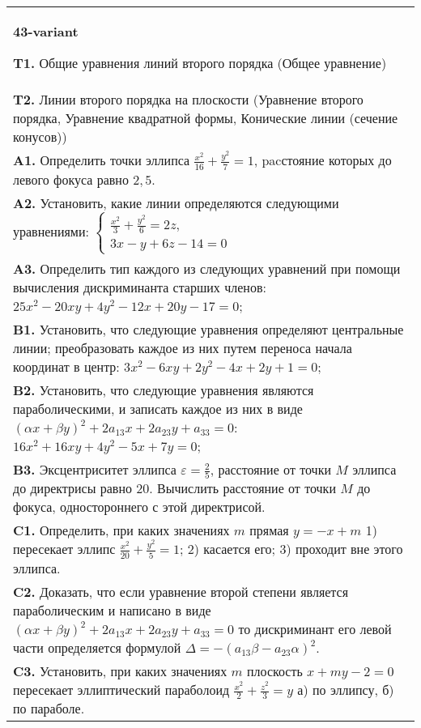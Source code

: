 \documentclass{article}
\begin{document}
\begin{tabular}{m{17cm}}
\textbf{43-variant}
\newline

\textbf{T1.} Общие уравнения линий второго порядка (Общее уравнение) \\
\textbf{T2.} Линии второго порядка на плоскости (Уравнение второго порядка, Уравнение квадратной формы, Конические линии (сечение конусов)) \\
\textbf{A1.} Определить точки эллипса $\frac{x^2}{16}+\frac{y^2}{7}=1$, pacстояние которых до левого фокуса равно $2,5$. \\
\textbf{A2.} Установить, какие линии определяются следующими уравнениями: $\left\{\begin{array}{l}\frac{x^2}{3}+\frac{y^2}{6}=2 z, \\ 3 x-y+6 z-14=0\end{array}\right.$ \\
\textbf{A3.} Определить тип каждого из следующих уравнений при помощи вычисления дискриминанта старших членов: $25 x^2-20 x y+4 y^2-12 x+20 y-17=0$; \\
\textbf{B1.} Установить, что следующие уравнения определяют центральные линии; преобразовать каждое из них путем переноса начала координат в центр: $3 x^2-6 x y+2 y^2-4 x+2 y+1=0$; \\
\textbf{B2.} Установить, что следующие уравнения являются параболическими, и записать каждое из них в виде $(\alpha x+\beta y)^2+2 a_{13} x+2 a_{23} y+a_{33}=0$: $16 x^2+16 x y+4 y^2-5 x+7 y=0$; \\
\textbf{B3.} Эксцентриситет эллипса $\varepsilon=\frac{2}{5}$, расстояние от точки $M$ эллипса до директрисы равно 20. Вычислить расстояние от точки $M$ до фокуса, одностороннего с этой директрисой. \\
\textbf{C1.} Определить, при каких значениях $m$ прямая $y=-x+m$ 1) пересекает эллипс $\frac{x^2}{20}+\frac{y^2}{5}=1$; 2) касается его; 3) проходит вне этого эллипса. \\
\textbf{C2.} Доказать, что если уравнение второй степени является параболическим и написано в виде $ (\alpha x+\beta y) ^2+2a_{13}x+2a_{23}y+a_{33}=0$ то дискриминант его левой части определяется формулой $\Delta=- (a_{13} \beta-a_{23} \alpha) ^2$. \\
\textbf{C3.} Установить, при каких значениях $m$ плоскость $x+m y-2=0$ пересекает эллиптический параболоид $\frac{x^2}{2}+\frac{z^2}{3}=y$ а) по эллипсу, б) по параболе. \\

\end{tabular}
\vspace{1cm}
\end{document}
